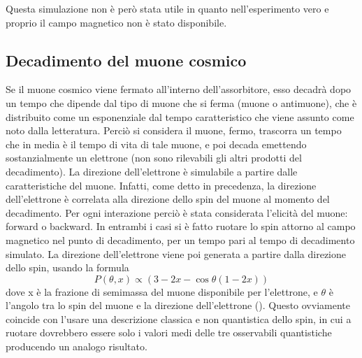 Questa simulazione non \`e per\`o stata utile in quanto nell'esperimento vero e proprio il campo magnetico non \`e stato disponibile.


\subsection{Decadimento del muone cosmico}
Se il muone cosmico viene fermato all'interno dell'assorbitore, esso decadrà dopo un tempo che dipende dal tipo di muone che si ferma (muone o antimuone), che è distribuito
come un esponenziale dal tempo caratteristico che viene assunto come noto dalla letteratura. Perciò si considera il muone, fermo, trascorra un tempo che in media è il tempo
di vita di tale muone, e poi decada emettendo sostanzialmente un elettrone (non sono rilevabili gli altri prodotti del decadimento). La direzione dell'elettrone \`e simulabile a partire dalle caratteristiche del muone. Infatti, come detto in precedenza, la direzione dell'elettrone \`e correlata alla direzione dello spin del muone al momento del decadimento. Per ogni interazione perci\`o \`e stata considerata l'elicit\`a del muone: forward o backward. In entrambi i casi si \`e fatto ruotare lo spin attorno al campo magnetico nel punto di decadimento, per un tempo pari al tempo di decadimento simulato. La direzione dell'elettrone viene poi generata a partire dalla direzione dello spin, usando la formula 
\begin{equation}
	P(\theta, x) \propto \left(3 - 2 x - \cos{\theta}\left(1 - 2 x\right)\right)
\end{equation}
dove x \`e la frazione di semimassa del muone disponibile per l'elettrone, e $\theta$ \`e l'angolo tra lo spin del muone e la direzione dell'elettrone (\cite{bib:mudecay}). Questo ovviamente coincide con l'usare una descrizione classica e non quantistica dello spin, in cui a ruotare dovrebbero essere solo i valori medi delle tre osservabili quantistiche producendo un analogo risultato.

